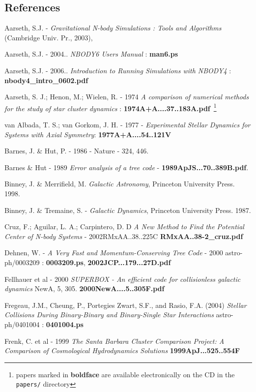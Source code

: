\begin{itemize}
\begin{itemize}
\chapter                {References}


Aarseth, S.J. - 
{\it Gravitational N-body Simulations : Tools and Algorithms} 
(Cambridge Univ. Pr., 2003),

Aarseth, S.J. - 2004.. {\it NBODY6 Users Manual} : {\bf man6.ps}

Aarseth, S.J. - 2006.. {\it Introduction to Running Simulations with NBODY4} : 
{\bf nbody4\_intro\_0602.pdf}


Aarseth, S. J.; Henon, M.; Wielen, R. - 1974
{\it A comparison of numerical methods for the study of star cluster 
dynamics} : {\bf 1974A+A....37..183A.pdf}~\footnote{papers marked 
in {\bf boldface} are available electronically on the CD in the {\tt papers/} directory}

van Albada, T. S.; van Gorkom, J. H.	- 1977 -
{\it Experimental Stellar Dynamics for Systems with Axial Symmetry}:
{\bf 1977A+A....54..121V}



Barnes, J. \& Hut, P. - 1986 - Nature - 324, 446.

Barnes \& Hut - 1989
{\it Error analysis of a tree code} - {\bf 1989ApJS...70..389B.pdf}.

Binney, J. \& Merrifield, M. {\it Galactic Astronomy}, Princeton University Press. 1998.

Binney, J. \& Tremaine, S. - {\it Galactic Dynamics}, Princeton University Press. 1987. 

Cruz, F.; Aguilar, L. A.; Carpintero, D. D
{\it A New Method to Find the Potential Center of N-body Systems} - 2002RMxAA..38..225C
{\bf RMxAA..38-2\_cruz.pdf}

Dehnen, W. - {\it A Very Fast and Momentum-Conserving Tree Code} - 2000
astro-ph/0003209 : {\bf 0003209.ps}, {\bf 2002JCP...179...27D.pdf}

Fellhauer et al - 2000 
{\it SUPERBOX - An efficient code for collisionless galactic dynamics}
NewA, 5, 305. {\bf 2000NewA....5..305F.pdf} 

Fregeau, J.M., Cheung, P., Portegies Zwart, S.F., and Rasio, F.A. (2004)
{\it Stellar Collisions During Binary-Binary and Binary-Single Star Interactions}
astro-ph/0401004 : {\bf 0401004.ps}

Frenk, C. et al - 1999 
{\it The Santa Barbara Cluster Comparison Project: A Comparison of Cosmological Hydrodynamics Solutions}
{\bf 1999ApJ...525..554F}


\end{itemize}
\end{itemize}

